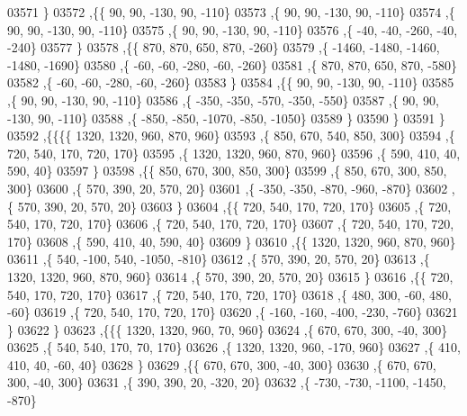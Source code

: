 \begin{DoxyCode}
03571     \}
03572    ,\{\{    90,    90,  -130,    90,  -110\}
03573     ,\{    90,    90,  -130,    90,  -110\}
03574     ,\{    90,    90,  -130,    90,  -110\}
03575     ,\{    90,    90,  -130,    90,  -110\}
03576     ,\{   -40,   -40,  -260,   -40,  -240\}
03577     \}
03578    ,\{\{   870,   870,   650,   870,  -260\}
03579     ,\{ -1460, -1480, -1460, -1480, -1690\}
03580     ,\{   -60,   -60,  -280,   -60,  -260\}
03581     ,\{   870,   870,   650,   870,  -580\}
03582     ,\{   -60,   -60,  -280,   -60,  -260\}
03583     \}
03584    ,\{\{    90,    90,  -130,    90,  -110\}
03585     ,\{    90,    90,  -130,    90,  -110\}
03586     ,\{  -350,  -350,  -570,  -350,  -550\}
03587     ,\{    90,    90,  -130,    90,  -110\}
03588     ,\{  -850,  -850, -1070,  -850, -1050\}
03589     \}
03590    \}
03591   \}
03592  ,\{\{\{\{  1320,  1320,   960,   870,   960\}
03593     ,\{   850,   670,   540,   850,   300\}
03594     ,\{   720,   540,   170,   720,   170\}
03595     ,\{  1320,  1320,   960,   870,   960\}
03596     ,\{   590,   410,    40,   590,    40\}
03597     \}
03598    ,\{\{   850,   670,   300,   850,   300\}
03599     ,\{   850,   670,   300,   850,   300\}
03600     ,\{   570,   390,    20,   570,    20\}
03601     ,\{  -350,  -350,  -870,  -960,  -870\}
03602     ,\{   570,   390,    20,   570,    20\}
03603     \}
03604    ,\{\{   720,   540,   170,   720,   170\}
03605     ,\{   720,   540,   170,   720,   170\}
03606     ,\{   720,   540,   170,   720,   170\}
03607     ,\{   720,   540,   170,   720,   170\}
03608     ,\{   590,   410,    40,   590,    40\}
03609     \}
03610    ,\{\{  1320,  1320,   960,   870,   960\}
03611     ,\{   540,  -100,   540, -1050,  -810\}
03612     ,\{   570,   390,    20,   570,    20\}
03613     ,\{  1320,  1320,   960,   870,   960\}
03614     ,\{   570,   390,    20,   570,    20\}
03615     \}
03616    ,\{\{   720,   540,   170,   720,   170\}
03617     ,\{   720,   540,   170,   720,   170\}
03618     ,\{   480,   300,   -60,   480,   -60\}
03619     ,\{   720,   540,   170,   720,   170\}
03620     ,\{  -160,  -160,  -400,  -230,  -760\}
03621     \}
03622    \}
03623   ,\{\{\{  1320,  1320,   960,    70,   960\}
03624     ,\{   670,   670,   300,   -40,   300\}
03625     ,\{   540,   540,   170,    70,   170\}
03626     ,\{  1320,  1320,   960,  -170,   960\}
03627     ,\{   410,   410,    40,   -60,    40\}
03628     \}
03629    ,\{\{   670,   670,   300,   -40,   300\}
03630     ,\{   670,   670,   300,   -40,   300\}
03631     ,\{   390,   390,    20,  -320,    20\}
03632     ,\{  -730,  -730, -1100, -1450,  -870\}

\end{DoxyCode}
